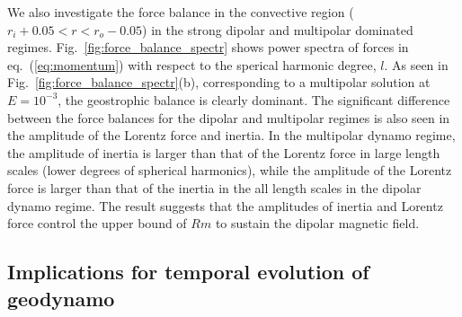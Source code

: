 We also investigate the force balance in the convective region ($r_{i} + 0.05 < r < r_{o} - 0.05$) in the strong dipolar and multipolar dominated regimes.
Fig.~\ref{fig:force_balance_spectr} shows power spectra of forces in eq.~(\ref{eq:momentum}) with respect to the sperical harmonic degree, $l$.
As seen in Fig.~\ref{fig:force_balance_spectr}(b), corresponding to a multipolar solution at $E = 10^{-3}$, the geostrophic balance is clearly dominant.
The significant difference between the force balances for the dipolar and multipolar regimes is also seen in the amplitude of the Lorentz force and inertia.
In the multipolar dynamo regime, the amplitude of inertia is larger than that of the Lorentz force in large length scales (lower degrees of spherical harmonics), while the amplitude of the Lorentz force is larger than that of the inertia in the all length scales in the dipolar dynamo regime.
The result suggests that the amplitudes of inertia and Lorentz force control the upper bound of $Rm$ to sustain the dipolar magnetic field.


\subsection{Implications for temporal evolution of geodynamo}

